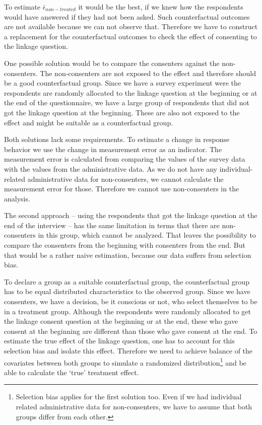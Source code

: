 To estimate \(\bar{\epsilon}_{non-treated}\) it would be the best, if we knew how the respondents would have answered if they had not been asked. Such counterfactual outcomes are not available because we can not observe that. Therefore we have to construct a replacement for the counterfactual outcomes to check the effect of consenting to the linkage question.

One possible solution would be to compare the consenters against the non-consenters. The non-consenters are not exposed to the effect and therefore should be a good counterfactual group. Since we have a survey experiment were the respondents are randomly allocated to the linkage question at the beginning or at the end of the questionnaire, we have a large group of respondents that did not got the linkage question at the beginning. These are also not exposed to the effect and might be suitable as a counterfactual group.

Both solutions lack some requirements. To estimate a change in response behavior we use the change in measurement error as an indicator. The measurement error is calculated from comparing the values of the survey data with the values from the administrative data. As we do not have any individual-related administrative data for non-consenters, we cannot calculate the measurement error for those. Therefore we cannot use non-consenters in the analysis.

The second approach -- using the respondents that got the linkage question at the end of the interview -- has the same limitation in terms that there are non-consenters in this group, which cannot be analyzed. That leaves the possibility to compare the consenters from the beginning with consenters from the end. But that would be a rather naive estimation, because our data suffers from selection bias.

To declare a group as a suitable counterfactual group, the counterfactual group has to be equal distributed characteristics to the observed group. Since we have consenters, we have a decision, be it conscious or not, who select themselves to be in a treatment group. Although the respondents were randomly allocated to get the linkage consent question at the beginning or at the end, these who gave consent at the beginning are different than those who gave consent at the end. To estimate the true effect of the linkage question, one has to account for this selection bias and isolate this effect. Therefore we need to achieve balance of the covariates between both groups to simulate a randomized distribution\footnote{Selection bias applies for the first solution too. Even if we had individual related administrative data for non-consenters, we have to assume that both groups differ from each other.} and be able to calculate the `true' treatment effect.

